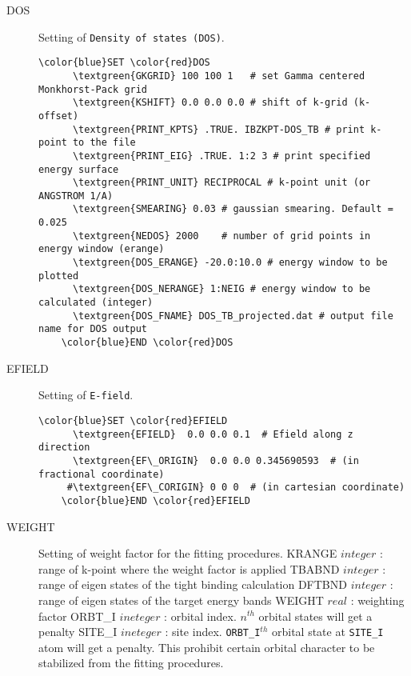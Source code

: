 \documentclass[a4paper,12pt]{scrartcl}
\makeatletter
\def\namedlabel#1#2{\begingroup
    #2%
    \def\@currentlabel{#2}%
    \phantomsection\label{#1}\endgroup
}
\newcommand{\textgreen}[1]{\textcolor{green!50!black}{\texttt{#1}}}
\makeatother
\begin{document}
\begin{description}
    \item[\namedlabel{tag:DOS}{DOS}]
        Setting of \texttt{Density of states (DOS)}.

 \begin{Verbatim}[commandchars=\\\{\},gobble=4, frame=single, framesep=2mm, 
    label= DOS setup example,
    labelposition=bottomline]
    \color{blue}SET \color{red}DOS
      \textgreen{GKGRID} 100 100 1   # set Gamma centered Monkhorst-Pack grid 
      \textgreen{KSHIFT} 0.0 0.0 0.0 # shift of k-grid (k-offset)
      \textgreen{PRINT_KPTS} .TRUE. IBZKPT-DOS_TB # print k-point to the file
      \textgreen{PRINT_EIG} .TRUE. 1:2 3 # print specified energy surface 
      \textgreen{PRINT_UNIT} RECIPROCAL # k-point unit (or ANGSTROM 1/A)
      \textgreen{SMEARING} 0.03 # gaussian smearing. Default = 0.025
      \textgreen{NEDOS} 2000    # number of grid points in energy window (erange)
      \textgreen{DOS_ERANGE} -20.0:10.0 # energy window to be plotted
      \textgreen{DOS_NERANGE} 1:NEIG # energy window to be calculated (integer)
      \textgreen{DOS_FNAME} DOS_TB_projected.dat # output file name for DOS output
    \color{blue}END \color{red}DOS
 \end{Verbatim}


    \item[\namedlabel{tag:EFIELD}{EFIELD}]
        Setting of \texttt{E-field}.

 \begin{Verbatim}[commandchars=\\\{\},gobble=4, frame=single, framesep=2mm, 
    label= EFIELD setup example,
    labelposition=bottomline]
    \color{blue}SET \color{red}EFIELD
      \textgreen{EFIELD}  0.0 0.0 0.1  # Efield along z direction
      \textgreen{EF\_ORIGIN}  0.0 0.0 0.345690593  # (in fractional coordinate)
     #\textgreen{EF\_CORIGIN} 0 0 0  # (in cartesian coordinate)
    \color{blue}END \color{red}EFIELD
 \end{Verbatim}


    \item[\namedlabel{tag:WEIGHT}{WEIGHT}]
		Setting of weight factor for the fitting procedures.
		\subitem KRANGE $integer$ : range of k-point where the weight factor is applied
		\subitem TBABND $integer$ : range of eigen states of the tight binding calculation 
		\subitem DFTBND $integer$ : range of eigen states of the target energy bands
		\subitem WEIGHT $real$ : weighting factor 
		\subitem ORBT\_I $ineteger$ : orbital index. $n^{th}$ orbital states will get a penalty
		\subitem SITE\_I $ineteger$ : site index. \texttt{ORBT\_I}$^{th}$  orbital state 
		at \texttt{SITE\_I} atom will get a penalty. This prohibit certain orbital character 
		to be stabilized from the fitting procedures.
		



\end{description}
\end{document}
